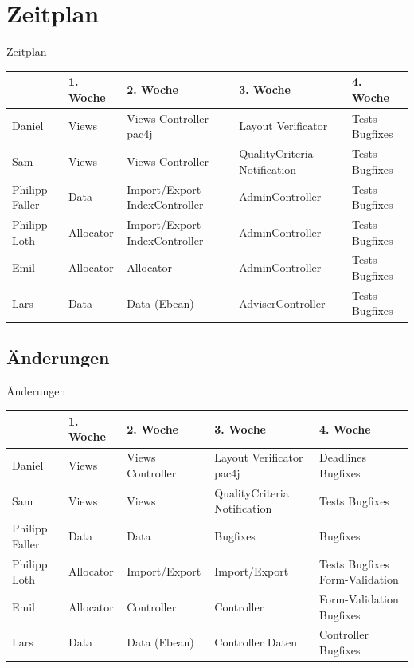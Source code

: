 \documentclass[18pt, xcolor=table]{beamer}
\begin{document}
\section{Zeitplan}
\begin{frame}[plain]{Zeitplan}
\begin{table}[H]
\begin{tabularx}{\textwidth}{l|l X X X}
\hline
 	& 1. Woche			& 2. Woche		& 3. Woche & 4. Woche\\
\hline 
Daniel	& Views			& Views \phantom{+} Controller  pac4j & Layout \phantom{++} Verificator & Tests \phantom{++} Bugfixes \\
\hline
Sam & Views&Views \phantom{+} Controller & QualityCriteria  Notification & Tests \phantom{++} Bugfixes \\
\hline
Philipp Faller&Data&Import/Export
Index\-Controller&Admin\-Controller&Tests \phantom{++}
Bugfixes \\
\hline
Philipp Loth&Allocator&Import/Export
Index\-Controller&Admin\-Controller&Tests \phantom{++}
Bugfixes \\
\hline
Emil&Allocator&Allocator&Admin\-Controller&Tests \phantom{++}
Bugfixes \\
\hline
Lars&Data&Data \phantom{++} (Ebean)&Adviser\-Controller&Tests \phantom{++}
Bugfixes 
\end{tabularx}
\end{table}
\end{frame}

\newcommand{\mehr}{\cellcolor{white!90!green}}
\newcommand{\weniger}{\cellcolor{white!90!red}}

\subsection{Änderungen}
\begin{frame}[plain]{Änderungen}
\begin{table}[H]
\begin{tabularx}{\textwidth}{l|l X X X}
\hline
 	& 1. Woche			& 2. Woche		& 3. Woche & 4. Woche\\
\hline 
Daniel	& Views			& \weniger Views \phantom{+} Controller & \mehr Layout \phantom{+} Verificator
\phantom{+} pac4j&\weniger Deadlines Bugfixes \\
\hline
Sam & Views&\weniger Views& QualityCriteria Notification & Tests \phantom{++} Bugfixes \\
\hline
Philipp Faller&Data&\weniger Data&\weniger Bugfixes&\weniger Bugfixes\\
\hline
Philipp Loth&Allocator&\weniger Import/Export
&\weniger Import/Export &\weniger \weniger Tests \phantom{++} Bugfixes Form-Validation\\
\hline
Emil&Allocator&\mehr Controller&\mehr Controller&\weniger Form-Validation Bugfixes\\
\hline
Lars&Data&Data \phantom{++} (Ebean)&\weniger Controller \phantom{+} Daten &
\weniger Controller \phantom{+} Bugfixes \\
\end{tabularx}
\end{table}
\end{frame}
\end{document}
